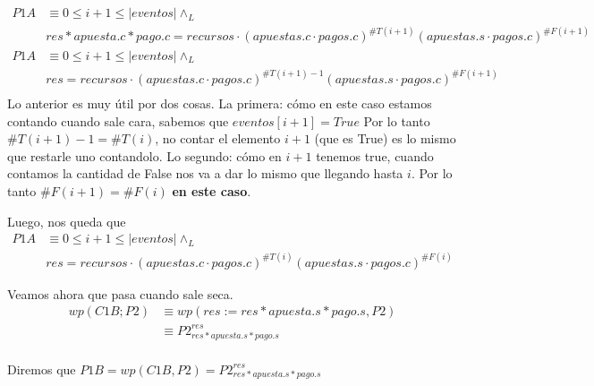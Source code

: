 \documentclass[../document.tex]{subfiles}
\begin{document}
\begin{equation} \label{eq2.a}
\begin{split}
P1A & \equiv 0\leq i+1 \leq |eventos| \land_L \\& res * apuesta.c * pago.c = recursos \cdot (apuestas.c\cdot pagos.c)^{\#T(i+1)}(apuestas.s\cdot pagos.c)^{\#F(i+1)}\\
P1A & \equiv 0\leq i+1 \leq |eventos| \land_L \\& res = recursos \cdot (apuestas.c\cdot pagos.c)^{\#T(i+1)-1}(apuestas.s\cdot pagos.c)^{\#F(i+1)}\\
\end{split}
\end{equation}
Lo anterior es muy útil por dos cosas.
La primera: cómo en este caso estamos contando cuando sale cara, sabemos que $eventos[i+1] = True$ Por lo tanto $\#T(i+1)-1=\#T(i)$, no contar el elemento $i+1$ (que es True) es lo mismo que restarle uno contandolo. Lo segundo: cómo en $i+1$ tenemos true, cuando contamos la cantidad de False nos va a dar lo mismo que llegando hasta $i$. Por lo tanto $\#F(i+1)=\#F(i)$ \textbf{en este caso}.

Luego, nos queda que
\begin{equation} 
    \begin{split}
    P1A & \equiv 0\leq i+1 \leq |eventos| \land_L \\& res = recursos \cdot (apuestas.c\cdot pagos.c)^{\#T(i)}(apuestas.s\cdot pagos.c)^{\#F(i)}
    \end{split}
\end{equation}

Veamos ahora que pasa cuando sale seca.
\begin{equation} \label{eq2.a}
\begin{split}
wp(C1B;P2) & \equiv wp(res := res * apuesta.s * pago.s, P2) \\
           & \equiv P2^{res}_{res * apuesta.s * pago.s} \\
\end{split}
\end{equation}

Diremos que $P1B = wp(C1B,P2) = P2^{res}_{res * apuesta.s * pago.s}$
\end{document}
